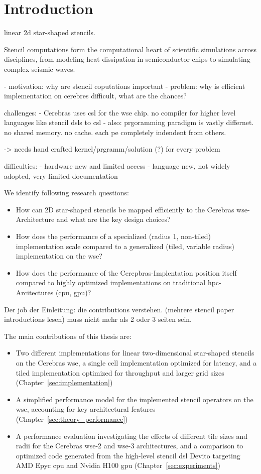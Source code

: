 \chapter{Introduction}

linear 2d star-shaped stencils. 

Stencil computations form the computational heart of scientific simulations across disciplines, from modeling heat dissipation in semiconductor chips to simulating complex seismic waves.

- motivation: why are stencil coputations important 
- problem: why is efficient implementation on cerebres difficult, what are the chances?

challenges:
- Cerebras uses \ac{csl} for the \ac{wse} chip. no compiler for higher level languages like stencil dsls to \ac{csl}
- also: prgoramming paradigm is vastly differnet. no shared memory. no cache. each \ac{pe} completely indendent from others.

-> needs hand crafted kernel/prgramm/solution (?) for every problem

difficulties:
- hardware new and limited access
- language new, not widely adopted, very limited documentation

We identify following research questions:
\begin{itemize}
    \item How can 2D star-shaped stencils be mapped efficiently to the Cerebras \ac{wse}-Architecture and what are the key design choices?
    \item How does the performance of a specialized (radius 1, non-tiled) implementation scale compared to a generalized (tiled, variable radius) implementation on the \ac{wse}?
    \item How does the performance of the Cerepbras-Implentation position itself compared to highly optimized implementations on traditional \ac{hpc}-Arcitectures (\ac{cpu}, \ac{gpu})? 
\end{itemize}

Der job der Einleitung: die contributions verstehen.
(mehrere stencil paper introductions lesen)
muss nicht mehr als 2 oder 3 seiten sein.

The main contributions of this thesis are:
\begin{itemize}
    \item Two different implementations for linear two-dimensional star-shaped stencils on the Cerebras \ac{wse}, a single cell implementation optimized for latency, and a tiled implementation optimized for throughput and larger grid sizes (Chapter~\autoref{sec:implementation})
    \item A simplified performance model for the implemented stencil operators on the \ac{wse}, accounting for key architectural features (Chapter~\autoref{sec:theory_performance})
    \item A performance evaluation investigating the effects of different tile sizes and radii for the Cerebras \ac{wse}-2 and \ac{wse}-3 architectures, and a comparison to optimized code generated from the high-level stencil \ac{dsl} Devito targeting AMD Epyc \ac{cpu} and Nvidia H100 \ac{gpu} (Chapter~\autoref{sec:experiments})
\end{itemize}
